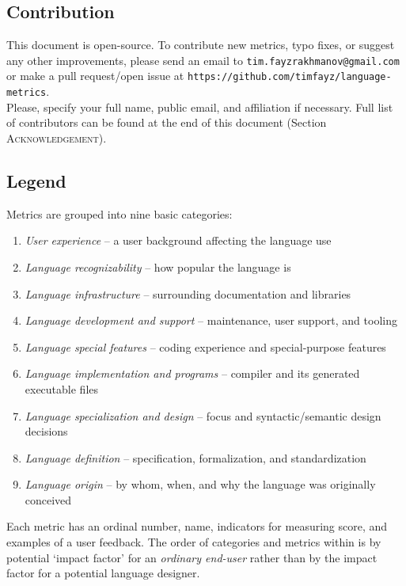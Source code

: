 \documentclass[11pt]{article}
\begin{document}
\subsection*{Contribution}
This document is open-source. To contribute new metrics, typo fixes, or suggest any other improvements, please send an email to \texttt{\small tim.\-fayzrakhmanov\-@gmail.com} or make a pull request/open issue at \texttt{\small https://\-github.com/\-timfayz/\-language-\-metrics}.\\
Please, specify your full name, public email, and affiliation if necessary. Full list of contributors can be found at the end of this document (Section \textsc{Acknowledgement}). 

\subsection*{Legend}

Metrics are grouped into nine basic categories:

\vspace{-5pt}
\begin{enumerate}
    \setlength\itemsep{-3pt}
    \item \textit{User experience} -- a user background affecting the language use
    \item \textit{Language recognizability} -- how popular the language is
    \item \textit{Language infrastructure} -- surrounding documentation and libraries
    \item \textit{Language development and support} -- maintenance, user support, and tooling
    \item \textit{Language special features} -- coding experience and special-purpose features
    \item \textit{Language implementation and programs} -- compiler and its generated executable files
    \item \textit{Language specialization and design} -- focus and syntactic/semantic design decisions
    \item \textit{Language definition} -- specification, formalization, and standardization
    \item \textit{Language origin} -- by whom, when, and why the language was originally conceived
\end{enumerate}
\vspace{-5pt}

Each metric has an ordinal number, name, indicators for measuring score, and examples of a user feedback. The order of categories and metrics within is by potential `impact factor' for an \textit{ordinary end-user} rather than by the impact factor for a potential language designer. 
\end{document}
